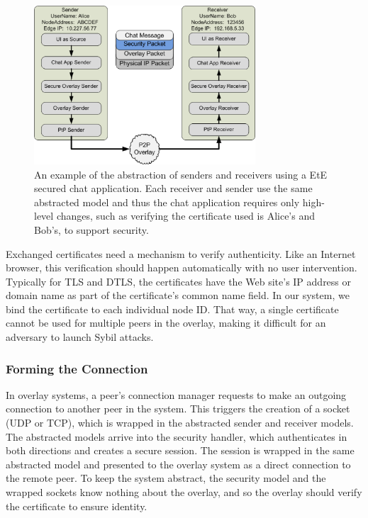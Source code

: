 \documentclass[conference]{IEEEtran}
\begin{document}
\begin{figure}[h]
\centering
\includegraphics[width=3.25in]{secure_sender_stack_generic.png.eps}
\caption{An example of the abstraction of senders and receivers using a EtE 
secured chat application.  Each receiver and sender use the same abstracted
model and thus the chat application requires only high-level changes, such
as verifying the certificate used is Alice's and Bob's, to support security.}
\label{fig:senders_receivers}
\end{figure}

Exchanged certificates need a mechanism to verify authenticity.  Like an
Internet browser, this verification should happen automatically with no user
intervention.  Typically for TLS and DTLS, the certificates have the Web site's
IP address or domain name as part of the certificate's common name field.  In
our system, we bind the certificate to each individual node ID.  That way,
a single certificate cannot be used for multiple peers in the overlay, making
it difficult for an adversary to launch Sybil attacks.

\subsubsection{Forming the Connection}
In overlay systems, a peer's connection manager requests to make an outgoing
connection to another peer in the system.  This triggers the creation of a
socket (UDP or TCP), which is wrapped in the abstracted sender and receiver
models.  The abstracted models arrive into the security handler, which
authenticates in both directions and creates a secure session.  The session is
wrapped in the same abstracted model and presented to the overlay system as a
direct connection to the remote peer.  To keep the system abstract, the security
model and the wrapped sockets know nothing about the overlay, and so the overlay
should verify the certificate to ensure identity.
\end{document}
